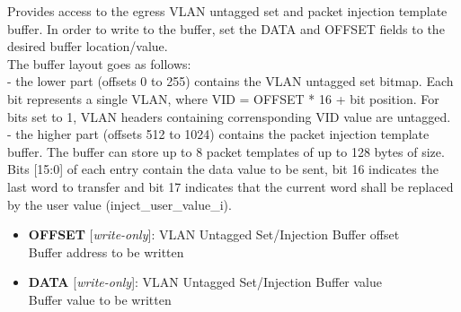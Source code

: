 \vspace{12pt}
Provides access to the egress VLAN untagged set and packet injection template buffer. In order to write to the buffer, set the DATA and OFFSET fields to the desired buffer location/value.\\       The buffer layout goes as follows:\\          - the lower part (offsets 0 to 255) contains the VLAN untagged set bitmap. Each bit represents a single VLAN, where VID = OFFSET * 16 + bit position. For bits set to 1, VLAN headers containing corrensponding VID value are untagged.\\       - the higher part (offsets 512 to 1024) contains the packet injection template buffer.         The buffer can store up to 8 packet templates of up to 128 bytes of size. Bits [15:0] of each entry contain the data value to be sent, bit 16 indicates the last word to transfer and bit 17 indicates that the current word shall be replaced by the user value (inject\_user\_value\_i).

\vspace{12pt}
\noindent
{}

\begin{itemize}
\item \begin{small}
{\bf 
OFFSET
} [\emph{write-only}]: VLAN Untagged Set/Injection Buffer offset
\\
Buffer address to be written
\end{small}
\item \begin{small}
{\bf 
DATA
} [\emph{write-only}]: VLAN Untagged Set/Injection Buffer value
\\
Buffer value to be written
\end{small}
\end{itemize}
